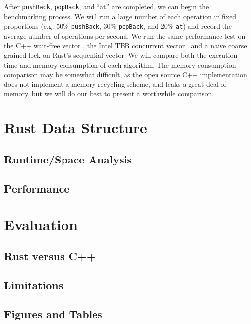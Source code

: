 \documentclass[conference]{IEEEtran}
\begin{document}
After \verb|pushBack|, \verb|popBack|, and “at” are completed, we can begin the benchmarking process. We will run a large number of each operation in fixed proportions (e.g. 50\% \verb|pushBack|, 30\% \verb|popBack|, and 20\% \verb|at|) and record the average number of operations per second. We run the same performance test on the C++ wait-free vector \cite{cpp, main}, the Intel TBB concurrent vector \cite{tbb}, and a naive coarse grained lock on Rust’s sequential vector. We will compare both the execution time and memory consumption of each algorithm. The memory consumption comparison may be somewhat difficult, as the open source C++ implementation does not implement a memory recycling scheme, and leaks a great deal of memory, but we will do our best to present a worthwhile comparison.

\section{Rust Data Structure}

    \subsection{Runtime/Space Analysis}
    
    \subsection{Performance}

\section{Evaluation}

    \subsection{Rust versus C++}
    
    \subsection{Limitations}

\subsection{Figures and Tables}





\end{document}
